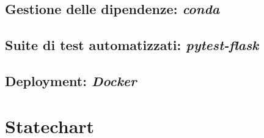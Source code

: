\documentclass[a4paper, 12 pt]{article}
\begin{document}
		\subsection*{Gestione delle dipendenze: \textit{conda}}
		\subsection*{Suite di test automatizzati: \textit{pytest-flask}}
		\subsection*{Deployment: \textit{Docker}}
	\break
	
	\section*{Statechart}
	\break
	
	
\end{document}
